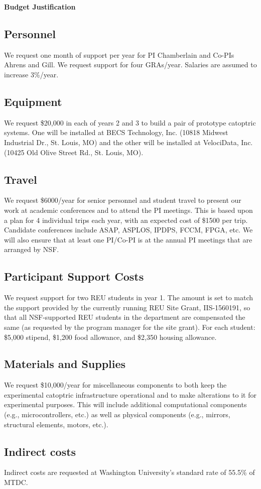 \documentclass[11pt]{article}
\begin{document}
\pagestyle{empty}
\thispagestyle{empty}

\begin{center}
\textbf{\Large Budget Justification}
\end{center}

\subsection*{Personnel}
We request one month of support per year for PI Chamberlain and Co-PIs
Ahrens and Gill.
We request support for four GRAs/year. Salaries are 
assumed to increase 3\%/year. 

\subsection*{Equipment}
We request \$20,000 in each of years 2 and 3 to build a pair of
prototype catoptric systems.  One will be installed at
BECS Technology, Inc. (10818 Midwest Industrial Dr., St. Louis, MO)
and the other will be installed at VelociData, Inc. (10425 Old Olive
Street Rd., St. Louis, MO).

\subsection*{Travel}
We request \$6000/year for senior personnel and student travel
to present our work at academic 
conferences and to attend the PI meetings.
This is based upon a plan for 4 individual trips
each year, with an expected cost of \$1500 per trip.
Candidate conferences include ASAP, ASPLOS, IPDPS, FCCM, FPGA, etc.
We will also ensure that at least one PI/Co-PI is
at the annual PI meetings that are arranged by NSF. 

\subsection*{Participant Support Costs}
We request support for two REU students in year 1. 
The amount is set to match the support provided by the currently
running REU Site Grant, IIS-1560191, so that all NSF-supported REU
students in the department are compensated the same (as requested by
the program manager for the site grant).
For each student: \$5,000 stipend, \$1,200 food allowance, and \$2,350
housing allowance.

\subsection*{Materials and Supplies}
We request \$10,000/year for
miscellaneous components to both keep the experimental catoptric
infrastructure operational and to make alterations to it for
experimental purposes. This will
include additional computational components (e.g., microcontrollers, etc.)
as well as physical components (e.g., mirrors, structural elements, motors,
etc.).

\subsection*{Indirect costs}
Indirect costs are requested at Washington University's standard rate of
55.5\% of MTDC.
\end{document}
